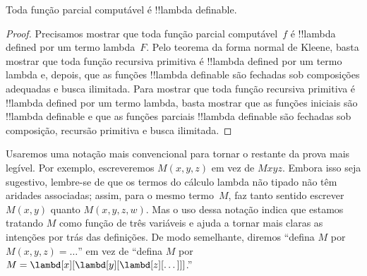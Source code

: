 \documentclass[../../../include/open-logic-section]{subfiles}
\begin{document}

\begin{thm}
Toda função parcial computável é !!{lambda definable}.
\end{thm}

\begin{proof}
Precisamos mostrar que toda função parcial computável~$f$ é
!!{lambda defined} por um termo lambda~$F$. Pelo teorema da forma normal de
Kleene, basta mostrar que toda função recursiva primitiva é !!{lambda
defined} por um termo lambda e, depois, que as funções !!{lambda definable}
são fechadas sob composições adequadas e busca ilimitada. Para mostrar que
toda função recursiva primitiva é !!{lambda defined} por um termo lambda,
basta mostrar que as funções iniciais são !!{lambda definable} e que as
funções parciais !!{lambda definable} são fechadas sob composição, recursão
primitiva e busca ilimitada.
\end{proof}

Usaremos uma notação mais convencional para tornar o restante da prova mais
legível. Por exemplo, escreveremos $M(x, y, z)$ em vez de $Mxyz$. Embora
isso seja sugestivo, lembre-se de que os termos do cálculo lambda não tipado
não têm aridades associadas; assim, para o mesmo termo~$M$, faz tanto sentido
escrever $M(x,y)$ quanto $M(x,y,z,w)$. Mas o uso dessa notação indica que
estamos tratando $M$ como função de três variáveis e ajuda a tornar mais
claras as intenções por trás das definições. De modo semelhante, diremos
``defina $M$ por $M(x,y,z) = \dots$'' em vez de ``defina $M$ por $M =
\lambd[x][\lambd[y][\lambd[z][\dots]]]$.''
\end{document}

